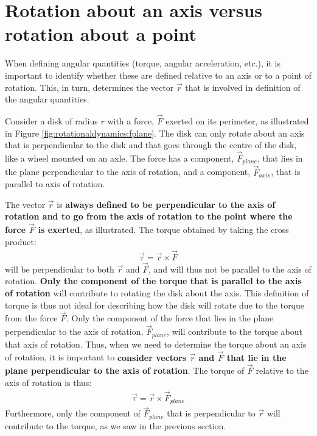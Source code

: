 \section{Rotation about an axis versus rotation about a point}
When defining angular quantities (torque, angular acceleration, etc.), it is important to identify whether these are defined relative to an axis or to a point of rotation. This, in turn, determines the vector $\vec r$ that is involved in definition of the angular quantities.

Consider a disk of radius $r$ with a force, $\vec F$ exerted on its perimeter, as illustrated in Figure \ref{fig:rotationaldynamics:fplane}. The disk can only rotate about an axis that is perpendicular to the disk and that goes through the centre of the disk, like a wheel mounted on an axle. The force has a component, $\vec F_{plane}$, that lies in the plane perpendicular to the axis of rotation, and a component, $\vec F_{axis}$, that is parallel to axis of rotation.

The vector $\vec r$ is  \textbf{always defined to be perpendicular to the axis of rotation and to go from the axis of rotation to the point where the force $\vec F$ is exerted}, as illustrated. The torque obtained by taking the cross product:
\begin{align*}
\vec \tau = \vec r \times \vec F
\end{align*}
will be perpendicular to both $\vec r$ and $\vec F$, and will thus not be parallel to the axis of rotation. \textbf{Only the component of the torque that is parallel to the axis of rotation} will contribute to rotating the disk about the axis. This definition of torque is thus not ideal for describing how the disk will rotate due to the torque from the force $\vec F$. Only the component of the force that lies in the plane perpendicular to the axis of rotation, $\vec F_{plane}$, will contribute to the torque about that axis of rotation. Thus, when we need to determine the torque about an axis of rotation, it is important to \textbf{consider vectors $\vec r$ and $\vec F$ that lie in the plane perpendicular to the axis of rotation}. The torque of $\vec F$ relative to the axis of rotation is thus:
\begin{align*}
\vec \tau = \vec r \times \vec F_{plane}
\end{align*}
Furthermore, only the component of $\vec F_{plane}$ that is perpendicular to $\vec r$ will contribute to the torque, as we saw in the previous section. 

